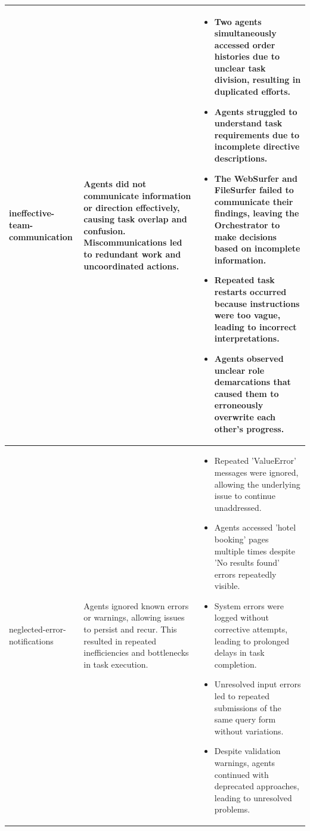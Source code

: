 \begin{longtable}{p{} p{} p{}}
ineffective-team-communication &
Agents did not communicate information or direction effectively, causing task overlap and confusion. Miscommunications led to redundant work and uncoordinated actions. &
\begin{itemize}
  \item Two agents simultaneously accessed order histories due to unclear task division, resulting in duplicated efforts.
  \item Agents struggled to understand task requirements due to incomplete directive descriptions.
  \item The WebSurfer and FileSurfer failed to communicate their findings, leaving the Orchestrator to make decisions based on incomplete information.
  \item Repeated task restarts occurred because instructions were too vague, leading to incorrect interpretations.
  \item Agents observed unclear role demarcations that caused them to erroneously overwrite each other's progress.
\end{itemize}
\\ \hline

neglected-error-notifications &
Agents ignored known errors or warnings, allowing issues to persist and recur. This resulted in repeated inefficiencies and bottlenecks in task execution. &
\begin{itemize}
  \item Repeated 'ValueError' messages were ignored, allowing the underlying issue to continue unaddressed.
  \item Agents accessed 'hotel booking' pages multiple times despite 'No results found' errors repeatedly visible.
  \item System errors were logged without corrective attempts, leading to prolonged delays in task completion.
  \item Unresolved input errors led to repeated submissions of the same query form without variations.
  \item Despite validation warnings, agents continued with deprecated approaches, leading to unresolved problems.
\end{itemize}
\\ \hline


\end{longtable}
